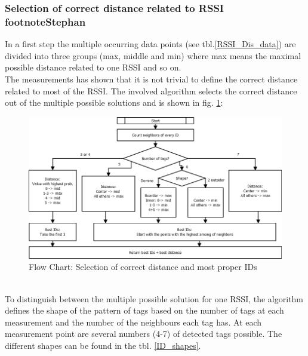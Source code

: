 \subsubsection[Selection of correct distance related to RSSI]{Selection of correct distance related to RSSI footnote{Stephan}}
In a first step the multiple occurring data points (see tbl.\ref{RSSI_Dis_data}) are divided into three groups (max, middle and min) where max means the maximal possible distance related to one RSSI and so on.\\ 
The measurements has shown that it is not trivial to define the correct distance related to most of the RSSI. The involved algorithm selects the correct distance out of the multiple possible solutions and is shown in fig. \ref{BestID}:\\
\begin{figure}[!htbp]
\centering
\includegraphics[width = 16cm]{Pictures/BestIDs}
\caption{Flow Chart: Selection of correct distance and most proper IDs}
\label{BestID}
\end{figure}\\
To distinguish between the multiple possible solution for one RSSI, the algorithm defines the shape of the pattern of tags based on the number of tags at each measurement and the number of the neighbours each tag has. At each measurement point are several numbers (4-7) of detected tags possible. The different shapes can be found in the tbl. \ref{ID_shapes}.\\

